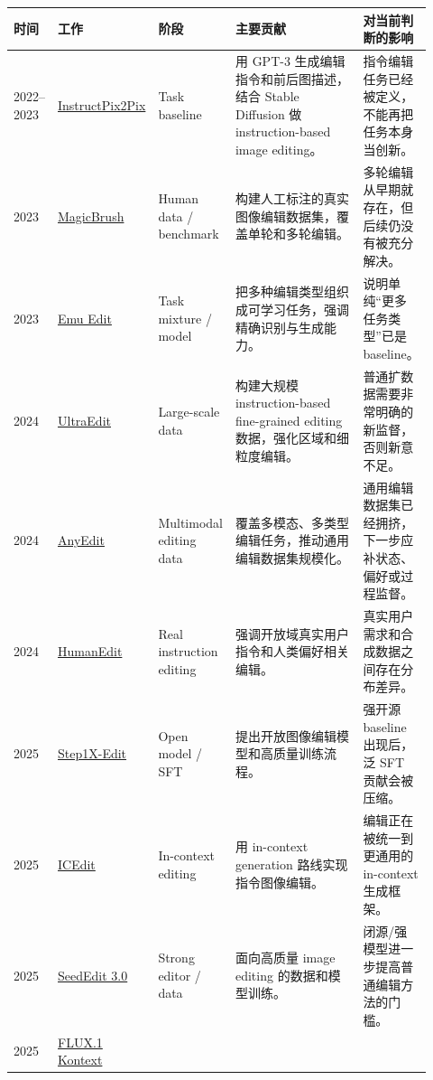 {\small
\setlength{\tabcolsep}{3pt}
\renewcommand{\arraystretch}{1.12}
\begin{longtable}{p{0.08\linewidth} p{0.18\linewidth} p{0.16\linewidth} p{0.34\linewidth} p{0.16\linewidth}}
\toprule
\textbf{时间} & \textbf{工作} & \textbf{阶段} & \textbf{主要贡献} & \textbf{对当前判断的影响} \\
\midrule
2022--2023 &
\href{https://arxiv.org/abs/2211.09800}{InstructPix2Pix} &
Task baseline &
用 GPT-3 生成编辑指令和前后图描述，结合 Stable Diffusion 做 instruction-based image editing。 &
指令编辑任务已经被定义，不能再把任务本身当创新。 \\
\midrule
2023 &
\href{https://arxiv.org/abs/2306.10012}{MagicBrush} &
Human data / benchmark &
构建人工标注的真实图像编辑数据集，覆盖单轮和多轮编辑。 &
多轮编辑从早期就存在，但后续仍没有被充分解决。 \\
\midrule
2023 &
\href{https://arxiv.org/abs/2311.10089}{Emu Edit} &
Task mixture / model &
把多种编辑类型组织成可学习任务，强调精确识别与生成能力。 &
说明单纯“更多任务类型”已是 baseline。 \\
\midrule
2024 &
\href{https://arxiv.org/abs/2407.05282}{UltraEdit} &
Large-scale data &
构建大规模 instruction-based fine-grained editing 数据，强化区域和细粒度编辑。 &
普通扩数据需要非常明确的新监督，否则新意不足。 \\
\midrule
2024 &
\href{https://arxiv.org/abs/2411.15738}{AnyEdit} &
Multimodal editing data &
覆盖多模态、多类型编辑任务，推动通用编辑数据集规模化。 &
通用编辑数据集已经拥挤，下一步应补状态、偏好或过程监督。 \\
\midrule
2024 &
\href{https://arxiv.org/abs/2412.04280}{HumanEdit} &
Real instruction editing &
强调开放域真实用户指令和人类偏好相关编辑。 &
真实用户需求和合成数据之间存在分布差异。 \\
\midrule
2025 &
\href{https://arxiv.org/abs/2504.17761}{Step1X-Edit} &
Open model / SFT &
提出开放图像编辑模型和高质量训练流程。 &
强开源 baseline 出现后，泛 SFT 贡献会被压缩。 \\
\midrule
2025 &
\href{https://arxiv.org/abs/2504.20690}{ICEdit} &
In-context editing &
用 in-context generation 路线实现指令图像编辑。 &
编辑正在被统一到更通用的 in-context 生成框架。 \\
\midrule
2025 &
\href{https://arxiv.org/abs/2506.05083}{SeedEdit 3.0} &
Strong editor / data &
面向高质量 image editing 的数据和模型训练。 &
闭源/强模型进一步提高普通编辑方法的门槛。 \\
\midrule
2025 &
\href{https://arxiv.org/abs/2506.15742}{FLUX.1 Kontext} &

\end{longtable}}
